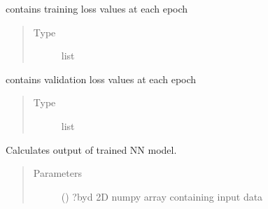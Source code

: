 \documentclass[letterpaper,10pt,english]{sphinxmanual}
\begin{document}
\begin{fulllineitems}
\begin{fulllineitems}
\begin{quote}
\begin{description}
\end{description}\end{quote}

\end{fulllineitems}


\begin{fulllineitems}
\label{\detokenize{rom:rom.response_surfaces.NN_alt.loss_train}}
\sphinxAtStartPar
contains training loss values at each epoch
\begin{quote}\begin{description}
\item[{Type}] \leavevmode
\sphinxAtStartPar
list

\end{description}\end{quote}

\end{fulllineitems}


\begin{fulllineitems}
\label{\detokenize{rom:rom.response_surfaces.NN_alt.loss_val}}
\sphinxAtStartPar
contains validation loss values at each epoch
\begin{quote}\begin{description}
\item[{Type}] \leavevmode
\sphinxAtStartPar
list

\end{description}\end{quote}

\end{fulllineitems}


\begin{fulllineitems}
\label{\detokenize{rom:rom.response_surfaces.NN_alt.predict}}
\sphinxAtStartPar
Calculates output of trained NN model.
\begin{quote}\begin{description}
\item[{Parameters}] \leavevmode
\sphinxAtStartPar
{} () \textendash{} ?\sphinxhyphen{}by\sphinxhyphen{}d 2D numpy array containing input data


\end{description}
\end{quote}
\end{fulllineitems}
\end{fulllineitems}
\end{document}
